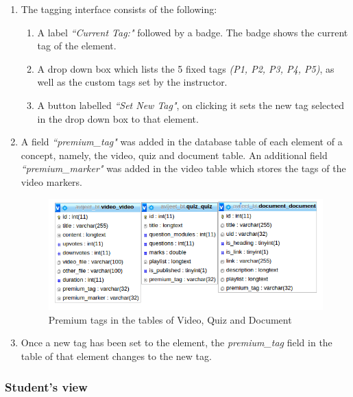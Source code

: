 \begin{enumerate}

	\item The tagging interface consists of the following:
	\begin{enumerate}
		\item A label \textit{``Current Tag:"} followed by a badge. The badge shows the current tag of the element.
		\item A drop down box which lists the 5 fixed tags \textit{(P1, P2, P3, P4, P5)}, as well as the custom tags set by the instructor.
		\item A button labelled \textit{``Set New Tag"}, on clicking it sets the new tag selected in the drop down box to that element.
	\end{enumerate}
	
	\item A field \textit{``premium\_tag"} was added in the database table of each element of a concept, namely, the video, quiz and document table. An additional field \textit{``premium\_marker"} was added in the video table which stores the tags of the video markers.
	
	\begin{figure}[h]
	\centering
	\includegraphics[width=0.9\linewidth]{./media/elementsSchema}
	\caption{Premium tags in the tables of Video, Quiz and Document}
	\label{fig:elementsSchema}
	\end{figure}

	\item Once a new tag has been set to the element, the \textit{premium\_tag} field in the table of that element changes to the new tag.
	
\end{enumerate}

\subsubsection{Student's view}

